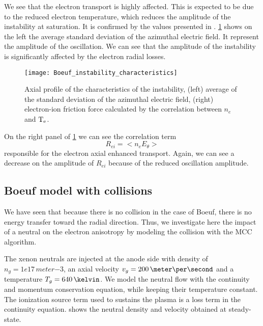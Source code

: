 We see that the electron transport is highly affected.
This is expected to be due to the reduced electron temperature, which reduces the amplitude of the instability at saturation.
It is confirmed by the values presented in .
\cref{fig-boeuf-instability} shows on the left the average standard deviation of the azimuthal electric field.
It represent the amplitude of the oscillation.
We can see that the amplitude of the instability is significantly affected by the electron radial losses.

\begin{figure}[hbtp]
  \centering
  \texttt{[image: Boeuf\_instability\_characteristics]}
  \caption{Axial profile of the characteristics of the instability, (left) average of the standard deviation of the azimuthal electric field, (right) electron-ion friction force calculated by the correlation between $n_e$ and $\mathrm{T_e}$.    }
  \label{fig-boeuf-instability}
\end{figure}

On the right panel of \cref{fig-boeuf-instability} we can see the correlation term
\begin{equation} \label{eq-rei}
  R_{ei} = < n_e E_{\theta} >
\end{equation}
responsible for the electron axial enhanced transport.
Again, we can see a decrease on the amplitude of $R_{ei}$ because of the reduced oscillation amplitude.


\subsection{Boeuf model with collisions} \label{subsec-MCC_boeuf}

We have seen that because there is no collision in the case of Boeuf, there is no energy transfer toward the radial direction.
Thus, we investigate here the impact of a neutral on the electron anisotropy by modeling the collision with the \ac{MCC} algorithm.

The xenon neutrals are injected at the anode side with density of $n_g=1e17\,meter$${-3}$, an axial velocity $v_g = 200 \,\meter\per\second$ and a temperature $T_g=640\,\kelvin$.
We model the neutral flow with the continuity and momentum conservation equation, while keeping their temperature constant.
The ionization source term used to sustains the plasma is a loss term in the continuity equation.
 shows the neutral density and velocity obtained at steady-state.

